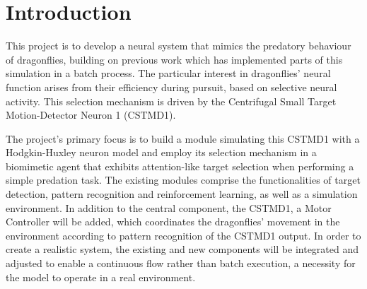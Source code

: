 \section{Introduction}

\par This project is to develop a neural system that mimics the predatory behaviour of dragonflies, building on previous work \cite{GITHUB1} which has implemented parts of this simulation in a batch process. The particular interest in dragonflies' neural function arises from their efficiency during pursuit, based on selective neural activity. This selection mechanism is driven by the Centrifugal Small Target Motion-Detector Neuron 1 (CSTMD1).

The project's primary focus is to build a module simulating this CSTMD1 with a Hodgkin-Huxley neuron model \cite{Hodgkin} and employ its selection mechanism in a biomimetic agent that exhibits attention-like target selection when performing a simple predation task. The existing modules comprise the functionalities of target detection, pattern recognition and reinforcement learning, as well as a simulation environment. In addition to the central component, the CSTMD1, a Motor Controller will be added, which coordinates the dragonflies' movement in the environment according to pattern recognition of the CSTMD1 output. In order to create a realistic system, the existing and new components will be integrated and adjusted to enable a continuous flow rather than batch execution, a necessity for the model to operate in a real environment. 

